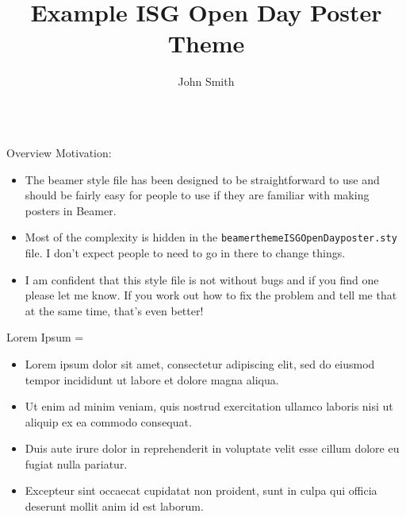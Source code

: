 \documentclass[final,hyperref={pdfpagelabels=false}]{beamer}
\title{Example ISG Open Day Poster Theme}
\author{John Smith}
\newcommand{\correctitemizeindent}{\setlength{\leftmargini}{2.5em}}
\newlength{\columnheight}
\begin{document}
\justifying
\begin{frame}
  \begin{columns}[T]

	\begin{column}{.32\textwidth}
		\begin{minipage}[t]{.95\textwidth}
		\parbox[t][\columnheight]{\textwidth}{	  	

	    \begin{leftColumnBlock}{Overview}
			Motivation:
			{\correctitemizeindent
			\begin{itemize}
				\item The beamer style file has been designed to be straightforward to use and should be fairly easy for people to use if they are familiar with making posters in Beamer.
				\item Most of the complexity is hidden in the \texttt{beamerthemeISGOpenDayposter.sty} file.  I don't expect people to need to go in there to change things.
				\item I am confident that this style file is not without bugs and if you find one please let me know.  If you work out how to fix the problem and tell me that at the same time, that's even better!
			\end{itemize}}
		\end{leftColumnBlock}

		\vfill

		\begin{leftColumnBlock}{Lorem Ipsum}
			\rightskip=\leftskip
			{\correctitemizeindent
			\begin{itemize}
				\item Lorem ipsum dolor sit amet, consectetur adipiscing elit, sed do eiusmod tempor incididunt ut labore et dolore magna aliqua.
				\item Ut enim ad minim veniam, quis nostrud exercitation ullamco laboris nisi ut aliquip ex ea commodo consequat.
				\item Duis aute irure dolor in reprehenderit in voluptate velit esse cillum dolore eu fugiat nulla pariatur.
				\item Excepteur sint occaecat cupidatat non proident, sunt in culpa qui officia deserunt mollit anim id est laborum.
			\end{itemize}
			}
		\end{leftColumnBlock}
		
		\vfill

}
\end{minipage}
\end{column}
\end{columns}
\end{frame}
\end{document}
